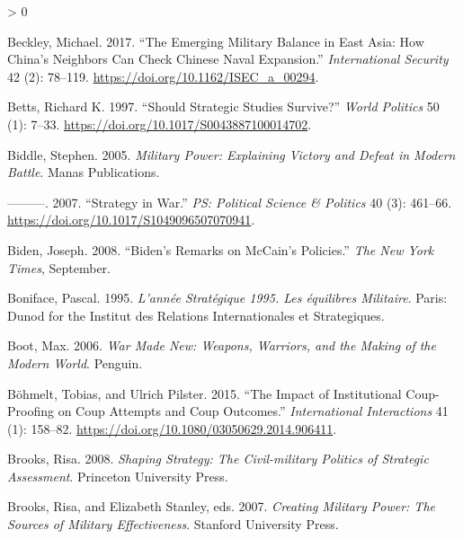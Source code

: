 \documentclass[
]{article}
\newlength{\cslhangindent}
\newenvironment{CSLReferences}[2] %
 {%
  \setlength{\parindent}{0pt}
  \ifodd #1 \everypar{\setlength{\hangindent}{\cslhangindent}}\ignorespaces\fi
  \ifnum #2 > 0
  \setlength{\parskip}{#2\baselineskip}
  \fi
 }%
 {}
\begin{document}
\begin{CSLReferences}{1}{0}
\leavevmode\hypertarget{ref-beckley_emergingmilitarybalance_2017}{}%
Beckley, Michael. 2017. {``The {Emerging Military Balance} in {East Asia}: {How China}'s {Neighbors Can Check Chinese Naval Expansion}.''} \emph{International Security} 42 (2): 78--119. \url{https://doi.org/10.1162/ISEC_a_00294}.

\leavevmode\hypertarget{ref-betts_shouldstrategicstudies_1997}{}%
Betts, Richard K. 1997. {``Should {Strategic Studies Survive}?''} \emph{World Politics} 50 (1): 7--33. \url{https://doi.org/10.1017/S0043887100014702}.

\leavevmode\hypertarget{ref-biddle_militarypowerexplaining_2005}{}%
Biddle, Stephen. 2005. \emph{Military {Power}: {Explaining Victory} and {Defeat} in {Modern Battle}}. {Manas Publications}.

\leavevmode\hypertarget{ref-biddle_strategywar_2007}{}%
---------. 2007. {``Strategy in {War}.''} \emph{PS: Political Science \& Politics} 40 (3): 461--66. \url{https://doi.org/10.1017/S1049096507070941}.

\leavevmode\hypertarget{ref-biden_bidenremarksmccain_2008}{}%
Biden, Joseph. 2008. {``Biden's {Remarks} on {McCain}'s {Policies}.''} \emph{The New York Times}, September.

\leavevmode\hypertarget{ref-boniface_anneestrategique1995_1995}{}%
Boniface, Pascal. 1995. \emph{L'année {Stratégique} 1995. {Les} équilibres Militaire}. {Paris}: {Dunod for the Institut des Relations Internationales et Strategiques}.

\leavevmode\hypertarget{ref-boot_warmadenew_2006}{}%
Boot, Max. 2006. \emph{War {Made New}: {Weapons}, {Warriors}, and the {Making} of the {Modern World}}. {Penguin}.

\leavevmode\hypertarget{ref-bohmelt_impactinstitutionalcoupproofing_2015}{}%
Böhmelt, Tobias, and Ulrich Pilster. 2015. {``The {Impact} of {Institutional Coup-Proofing} on {Coup Attempts} and {Coup Outcomes}.''} \emph{International Interactions} 41 (1): 158--82. \url{https://doi.org/10.1080/03050629.2014.906411}.

\leavevmode\hypertarget{ref-brooks_shapingstrategycivilmilitary_2008}{}%
Brooks, Risa. 2008. \emph{Shaping {Strategy}: {The Civil-military Politics} of {Strategic Assessment}}. {Princeton University Press}.

\leavevmode\hypertarget{ref-brooks_creatingmilitarypower_2007}{}%
Brooks, Risa, and Elizabeth Stanley, eds. 2007. \emph{Creating {Military Power}: {The Sources} of {Military Effectiveness}}. {Stanford University Press}.


\end{CSLReferences}
\end{document}
